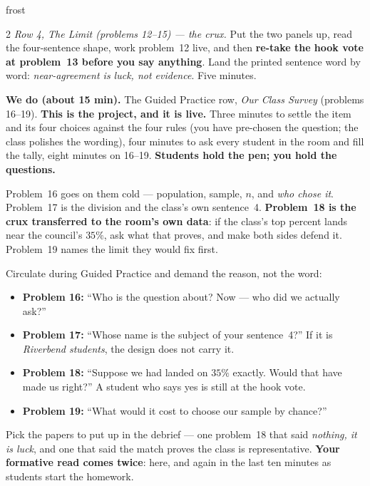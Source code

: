 \documentclass[10pt]{article}
\begin{document}
\begin{skillbox}{frost}
\begin{multicols}{2}
\emph{Row 4, The Limit (problems 12--15) --- the crux.} Put the two panels up, read the
four-sentence shape, work problem~12 live, and then \textbf{re-take the hook vote at problem~13
before you say anything}. Land the printed sentence word by word: \emph{near-agreement is luck,
not evidence}. Five minutes.

\columnbreak
\textbf{We do (about 15 min).} The Guided Practice row, \emph{Our Class Survey} (problems
16--19). \textbf{This is the project, and it is live.} Three minutes to settle the item and its
four choices against the four rules (you have pre-chosen the question; the class polishes the
wording), four minutes to ask every student in the room and fill the tally, eight minutes on
16--19. \textbf{Students hold the pen; you hold the questions.}

Problem~16 goes on them cold --- population, sample, $n$, and \emph{who chose it}. Problem~17 is
the division and the class's own sentence~4. \textbf{Problem~18 is the crux transferred to the
room's own data}: if the class's top percent lands near the council's $35\%$, ask what that
proves, and make both sides defend it. Problem~19 names the limit they would fix first.

Circulate during Guided Practice and demand the reason, not the word:
\begin{itemize}[leftmargin=1.1em, nosep]
  \item \textbf{Problem 16:} ``Who is the question about? Now --- who did we actually ask?''
  \item \textbf{Problem 17:} ``Whose name is the subject of your sentence~4?'' If it is
        \emph{Riverbend students}, the design does not carry it.
  \item \textbf{Problem 18:} ``Suppose we had landed on $35\%$ exactly. Would that have made us
        right?'' A student who says yes is still at the hook vote.
  \item \textbf{Problem 19:} ``What would it cost to choose our sample by chance?''
\end{itemize}
Pick the papers to put up in the debrief --- one problem~18 that said \emph{nothing, it is luck},
and one that said the match proves the class is representative. \textbf{Your formative read comes
twice}: here, and again in the last ten minutes as students start the homework.
\end{multicols}
\end{skillbox}
\end{document}
